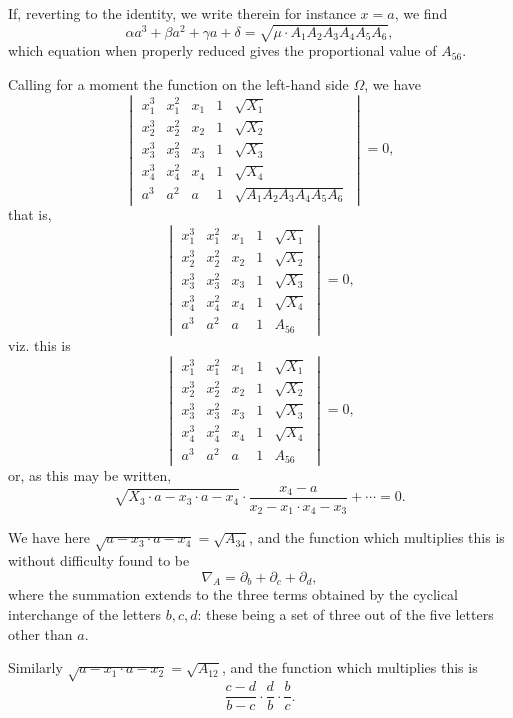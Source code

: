 \documentclass[11pt,a4paper]{book}
\begin{document}
\begin{art}
If, reverting to the identity, we write therein for instance $x = a$, we find
\[
\alpha a^3 + \beta a^2 + \gamma a + \delta = \sqrt{\mu \cdot A_1 A_2 A_3 A_4 A_5 A_6},
\]
which equation when properly reduced gives the proportional value of $A_{56}$.
\end{art}

\begin{art}
Calling for a moment the function on the left-hand side $\Omega$, we have
\[
\begin{vmatrix}
x_1^3 & x_1^2 & x_1 & 1 & \sqrt{X_1} \\
x_2^3 & x_2^2 & x_2 & 1 & \sqrt{X_2} \\
x_3^3 & x_3^2 & x_3 & 1 & \sqrt{X_3} \\
x_4^3 & x_4^2 & x_4 & 1 & \sqrt{X_4} \\
a^3 & a^2 & a & 1 & \sqrt{A_1 A_2 A_3 A_4 A_5 A_6}
\end{vmatrix} = 0,
\]
that is,
\[
\begin{vmatrix}
x_1^3 & x_1^2 & x_1 & 1 & \sqrt{X_1} \\
x_2^3 & x_2^2 & x_2 & 1 & \sqrt{X_2} \\
x_3^3 & x_3^2 & x_3 & 1 & \sqrt{X_3} \\
x_4^3 & x_4^2 & x_4 & 1 & \sqrt{X_4} \\
a^3 & a^2 & a & 1 & A_{56}
\end{vmatrix} = 0,
\]
viz. this is
\[
\begin{vmatrix}
x_1^3 & x_1^2 & x_1 & 1 & \sqrt{X_1} \\
x_2^3 & x_2^2 & x_2 & 1 & \sqrt{X_2} \\
x_3^3 & x_3^2 & x_3 & 1 & \sqrt{X_3} \\
x_4^3 & x_4^2 & x_4 & 1 & \sqrt{X_4} \\
a^3 & a^2 & a & 1 & A_{56}
\end{vmatrix} = 0,
\]
or, as this may be written,
\[
\sqrt{X_3 \cdot a - x_3 \cdot a - x_4} \cdot \frac{x_4 - a}{x_2 - x_1 \cdot x_4 - x_3} + \cdots = 0.
\]

We have here $\sqrt{a - x_3 \cdot a - x_4} = \sqrt{A_{34}}$, and the function which multiplies this is without difficulty found to be
\[
\nabla_A = \partial_b + \partial_c + \partial_d,
\]
where the summation extends to the three terms obtained by the cyclical interchange of the letters $b,c,d$: these being a set of three out of the five letters other than $a$.

Similarly $\sqrt{a - x_1 \cdot a - x_2} = \sqrt{A_{12}}$, and the function which multiplies this is
\[
\frac{c-d}{b-c} \cdot \frac{d}{b} \cdot \frac{b}{c}.
\]


\end{art}
\end{document}
